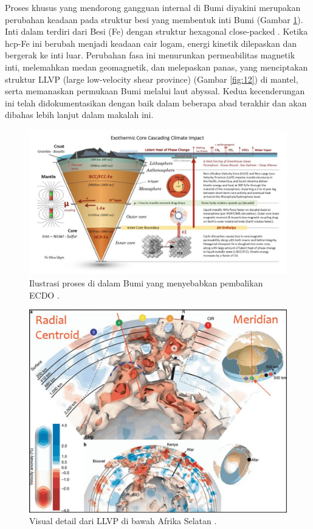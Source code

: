\documentclass[10pt,twocolumn,letterpaper]{article}
\begin{document}
Proses khusus yang mendorong gangguan internal di Bumi diyakini merupakan perubahan keadaan pada struktur besi yang membentuk inti Bumi (Gambar \ref{fig:11}). Inti dalam terdiri dari Besi (Fe) dengan struktur hexagonal close-packed \cite{141}. Ketika hcp-Fe ini berubah menjadi keadaan cair logam, energi kinetik dilepaskan dan bergerak ke inti luar. Perubahan fasa ini menurunkan permeabilitas magnetik inti, melemahkan medan geomagnetik, dan melepaskan panas, yang menciptakan struktur LLVP (large low-velocity shear province) (Gambar \ref{fig:12}) \cite{38} di mantel, serta memanaskan permukaan Bumi melalui laut abyssal. Kedua kecenderungan ini telah didokumentasikan dengan baik dalam beberapa abad terakhir dan akan dibahas lebih lanjut dalam makalah ini.

\begin{figure}[t]
\begin{center}
\includegraphics[width=1\textwidth]{layers.jpg}
\end{center}
   \caption{Ilustrasi proses di dalam Bumi yang menyebabkan pembalikan ECDO \cite{129}.}
\label{fig:11}
\end{figure}
\begin{figure}[t]
\begin{center}
   \includegraphics[width=1\linewidth]{llvp.jpg}
\end{center}
   \caption{Visual detail dari LLVP di bawah Afrika Selatan \cite{28}.}
\label{fig:12}
\label{fig:onecol}
\end{figure}
\end{document}
